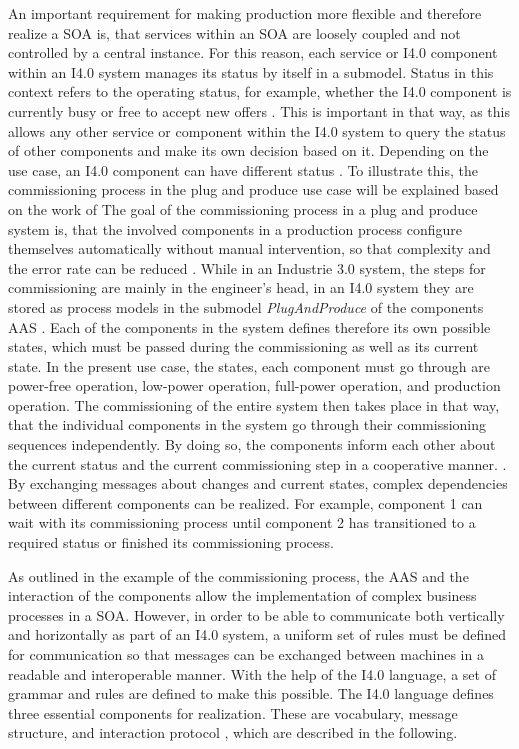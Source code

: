 An important requirement for making production more flexible and therefore realize a \ac{SOA} is, that services within an \ac{SOA} are loosely coupled and not controlled by a central instance. For this reason, each service or \ac{I4.0} component within an \ac{I4.0} system manages its status by itself in a submodel. Status in this context refers to the operating status, for example, whether the \ac{I4.0} component is currently busy or free to accept new offers \cite[p. 38 ]{Epple2018BaSysAufbaus}. This is important in that way, as this allows any other service or component within the \ac{I4.0} system to query the status of other components and make its own decision based on it. Depending on the use case, an \ac{I4.0} component can have different status \cite[p. 30]{Epple2018BaSysAufbaus}. To illustrate this, the commissioning process in the plug and produce use case will be explained based on the work of \citeauthor{Schweizer2021ProcessSystems} The goal of the commissioning process in a plug and produce system is, that the involved components in a production process configure themselves automatically without manual intervention, so that complexity and the error rate can be reduced \cite[p. 244]{Schweizer2021ProcessSystems}. While in an Industrie 3.0 system, the steps for commissioning are mainly in the engineer's head, in an \ac{I4.0} system they are stored as process models in the submodel \textit{PlugAndProduce} of the components \ac{AAS} \cite[p. 246]{Schweizer2021ProcessSystems}. Each of the components in the system defines therefore its own possible states, which must be passed during the commissioning as well as its current state. In the present use case, the states, each component must go through are power-free operation, low-power operation, full-power operation, and production operation. The commissioning of the entire system then takes place in that way, that the individual components in the system go through their commissioning sequences independently. By doing so, the components inform each other about the current status and the current commissioning step in a cooperative manner. \cite[p. 252]{Schweizer2021ProcessSystems}. By exchanging messages about changes and current states, complex dependencies between different components can be realized. For example, component 1 can wait with its commissioning process until component 2 has transitioned to a required status or finished its commissioning process.       

As outlined in the example of the commissioning process, the \ac{AAS} and the interaction of the components allow the implementation of complex business processes in a \ac{SOA}. However, in order to be able to communicate both vertically and horizontally as part of an I4.0 system, a uniform set of rules must be defined for communication so that messages can be exchanged between machines in a readable and interoperable manner. With the help of the \ac{I4.0} language, a set of grammar and rules are defined to make this possible. The \ac{I4.0} language defines three essential components for realization. These are vocabulary, message structure, and interaction protocol \cite[p. 12, figure 8]{Bock2016Weiterentwicklung4.0-Komponenten}, which are described in the following.

